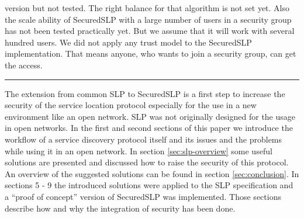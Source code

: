 version but not tested. The right balance for that algorithm is not set yet.
Also the scale ability of SecuredSLP with a large number of users in a security
group has not been tested practically yet. But we assume that it will work
with several hundred users. We did not apply any trust model to the SecuredSLP
implementation. That means anyone, who wants to join a security group, can get
the access.\\ \hrule The extension from common SLP to SecuredSLP is a first
step to increase the security of the service location protocol especially for
the use in a new environment like an open network. SLP was not originally
designed for the usage in open networks. In the first and second sections of
this paper we introduce the workflow of a service discovery protocol itself and
its issues and the problems while using it in an open network. In section
\ref{sec:slp-overview} some useful solutions are presented and discussed how to
raise the security of this protocol. An overview of the suggested solutions can
be found in section \ref{sec:conclusion}. In sections 5 - 9 the introduced
solutions were applied to the SLP specification and a ``proof of concept''
version of SecuredSLP was implemented. Those sections describe how and why the
integration of security has been done.
